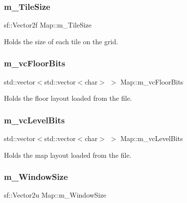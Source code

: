 \subsubsection{\texorpdfstring{m\+\_\+\+Tile\+Size}{m\_TileSize}}
{\footnotesize\ttfamily sf\+::\+Vector2f Map\+::m\+\_\+\+Tile\+Size\hspace{0.3cm}{\ttfamily [private]}}



Holds the size of each tile on the grid. 

\mbox{\label{class_map_a75e0865954fc95295c95dd7e54b83e50}} 
\subsubsection{\texorpdfstring{m\+\_\+vc\+Floor\+Bits}{m\_vcFloorBits}}
{\footnotesize\ttfamily std\+::vector$<$std\+::vector$<$char$>$ $>$ Map\+::m\+\_\+vc\+Floor\+Bits\hspace{0.3cm}{\ttfamily [private]}}



Holds the floor layout loaded from the file. 

\mbox{\label{class_map_ade62d9b07c3b6ce72e1d45d8e5fd57e7}} 
\subsubsection{\texorpdfstring{m\+\_\+vc\+Level\+Bits}{m\_vcLevelBits}}
{\footnotesize\ttfamily std\+::vector$<$std\+::vector$<$char$>$ $>$ Map\+::m\+\_\+vc\+Level\+Bits\hspace{0.3cm}{\ttfamily [private]}}



Holds the map layout loaded from the file. 

\mbox{\label{class_map_a57cc3ace36650776ee274199955be418}} 
\subsubsection{\texorpdfstring{m\+\_\+\+Window\+Size}{m\_WindowSize}}
{\footnotesize\ttfamily sf\+::\+Vector2u Map\+::m\+\_\+\+Window\+Size\hspace{0.3cm}{\ttfamily [private]}}



